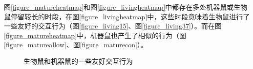 图\ref{figure_matureheatmap}和图\ref{figure_livingheatmap}中都存在多处机器鼠或生物鼠停留较长的时段，在图\ref{figure_livingheatmap}中，这些时段意味着生物鼠进行了一些友好的交互行为（图\ref{figure_living15}、图\ref{figure_living37}）。而在图\ref{figure_matureheatmap}中，机器鼠也产生了相似的行为（图\ref{figure_matureallow}、图\ref{figure_maturecon}）。
\begin{figure}[htbp]
  \vspace{13pt}
  \centering
  \caption{生物鼠和机器鼠的一些友好交互行为}\label{figure_living1537}
\end{figure}

